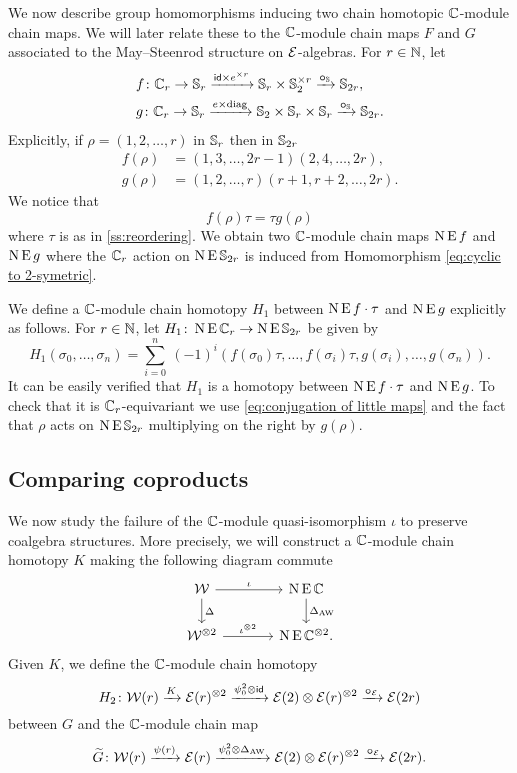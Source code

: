 We now describe group homomorphisms inducing two chain homotopic $\mathbb{C}$-module chain maps.
We will later relate these to the $\mathbb{C}$-module chain maps $F$ and $G$ associated to the May--Steenrod structure on $\mathcal{E}$-algebras.
For $r \in \mathbb{N}$, let
\[
\begin{split}
	&f \colon \mathbb{C}_r \to \mathbb{S}_r \xrightarrow{\mathsf{id} \times e^{\times r}} \mathbb{S}_r \times \mathbb{S}_2^{\times r} \xrightarrow{\bm{\circ}_{\mathbb{S}}} \mathbb{S}_{2r}, \\
	&g \colon \mathbb{C}_r \to \mathbb{S}_r \xrightarrow{e \times \mathrm{diag}} \mathbb{S}_2 \times \mathbb{S}_r \times \mathbb{S}_r \xrightarrow{\bm{\circ}_{\mathbb{S}}} \mathbb{S}_{2r}.
\end{split}
\]
Explicitly, if $\rho = (1,2,\dots,r)$ in $\mathbb{S}_r$ then in $\mathbb{S}_{2r}$
\begin{align*}
	f(\rho) &= (1,3,\dots,2r-1)(2,4,\dots,2r), \\
	g(\rho) &= (1,2,\dots,r)(r+1,r+2,\dots,2r).
\end{align*}
We notice that
\begin{equation}\label{eq:conjugation of little maps}
	f(\rho) \tau = \tau g(\rho)
\end{equation}
where $\tau$ is as in \cref{ss:reordering}.
We obtain two $\mathbb{C}$-module chain maps $\operatorname{N}\operatorname{E} f$ and $\operatorname{N}\operatorname{E} g$ where the $\mathbb{C}_r$ action on $\operatorname{N}\operatorname{E}\mathbb{S}_{2r}$ is induced from Homomorphism \eqref{eq:cyclic to 2-symetric}.

We define a $\mathbb{C}$-module chain homotopy $H_1$ between $\operatorname{N} \operatorname{E} f \cdot \tau$ and $\operatorname{N} \operatorname{E} g$
explicitly as follows.
For $r \in \mathbb{N}$, let $H_1 \colon \operatorname{N}\operatorname{E}\mathbb{C}_r \to \operatorname{N}\operatorname{E}\mathbb{S}_{2r}$ be given by
\[
H_1(\sigma_0,\dots,\sigma_n) =
\sum_{i=0}^n \ (-1)^i (f(\sigma_0) \tau, \dots, f(\sigma_i) \tau, g(\sigma_i), \dots, g(\sigma_n)).
\]
It can be easily verified that $H_1$ is a homotopy between $\operatorname{N} \operatorname{E} f \cdot \tau$ and $\operatorname{N} \operatorname{E} g$.
To check that it is $\mathbb{C}_r$-equivariant we use \cref{eq:conjugation of little maps} and the fact that $\rho$ acts on $\operatorname{N}\operatorname{E}\mathbb{S}_{2r}$ multiplying on the right by $g(\rho)$.

\subsection{Comparing coproducts}

We now study the failure of the $\mathbb{C}$-module quasi-isomorphism $\iota$ to preserve coalgebra structures.
More precisely, we will construct a $\mathbb{C}$-module chain homotopy $K$ making the following diagram commute
\begin{equation}\label{d:coproducts}
	\begin{tikzcd}[column sep=large]
			\cW \arrow[r,"\iota"] \arrow[d,"\Delta"] & \chains\EE\cyc \arrow[d,"\Delta_{\AW}"]\\
			\cW^{\ot 2} \arrow[r,"\iota^{\ot 2}"] & \chains\EE\cyc^{\ot 2}.
		\end{tikzcd}
\end{equation}
Given $K$, we define the $\mathbb{C}$-module chain homotopy
\[
H_2 \colon \mathcal{W}(r) \xrightarrow{K} \mathcal{E}(r)^{\otimes 2} \xrightarrow{\psi^2_0 \otimes \mathsf{id}} \mathcal{E}(2) \otimes \mathcal{E}(r)^{\otimes 2} \xrightarrow{\bm{\circ}_{\mathcal{E}}} \mathcal{E}(2r)
\]
between $G$ and the $\mathbb{C}$-module chain map
\[
\widetilde G \colon \mathcal{W}(r) \xrightarrow{\psi(r)} \mathcal{E}(r) \xrightarrow{\psi^2_0 \otimes \Delta_{\operatorname{AW}}} \mathcal{E}(2) \otimes \mathcal{E}(r)^{\otimes 2} \xrightarrow{\bm{\circ}_{\mathcal{E}}} \mathcal{E}(2r).
\]

